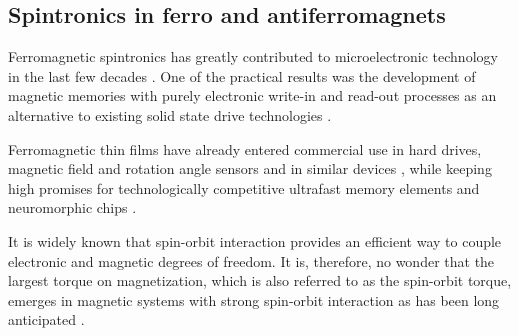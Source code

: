 
\subsection{Spintronics in ferro and antiferromagnets}
Ferromagnetic spintronics has greatly contributed to microelectronic technology in the last few decades \cite{bader_spintronics_2010, sinova_new_2012, bhatti_spintronics_2017}. One of the practical results was the development of magnetic memories with purely electronic write-in and read-out processes as an alternative to existing solid state drive technologies \cite{kent_new_2015, sato_two-terminal_2018}.

Ferromagnetic thin films have already entered commercial use in hard drives, magnetic field and rotation angle sensors and in similar devices \cite{Parkin2003,Jogschies2015,Novoselov2019}, while keeping high promises for technologically competitive ultrafast memory elements \cite{Lau2016} and neuromorphic chips \cite{Fukami2016}. 

It is widely known that spin-orbit interaction provides an efficient way to couple electronic and magnetic degrees of freedom. It is, therefore, no wonder that the largest torque on magnetization, which is also referred to as the spin-orbit torque, emerges in magnetic systems with strong spin-orbit interaction \cite{miron_current-driven_2010,haney_current_2013} as has been long anticipated \cite{dyakonov_current-induced_1971}. 

